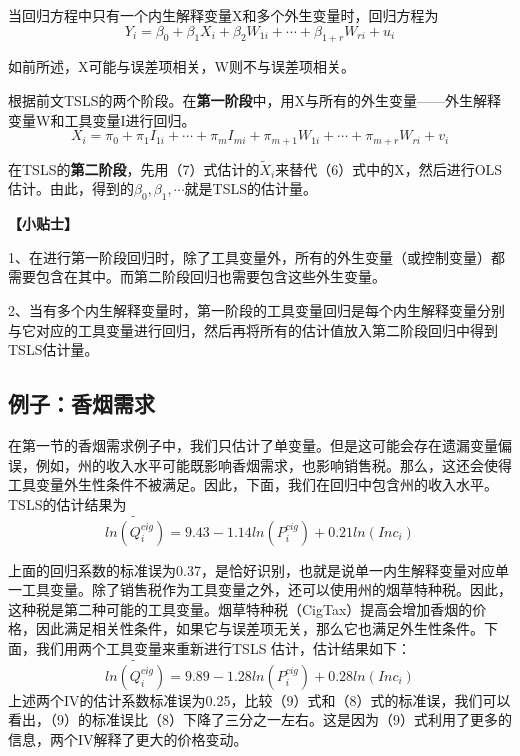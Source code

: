 \documentclass[cn,10pt,math=newtx,citestyle=gb7714-2015,bibstyle=gb7714-2015]{elegantbook}
\begin{document}
	当回归方程中只有一个内生解释变量X和多个外生变量时，回归方程为
	\begin{equation}
		Y_i=\beta_0+\beta_1X_i+\beta_2W_{1i}+\cdots+\beta_{1+r}W_{ri}+u_i
	\end{equation}
	
	如前所述，X可能与误差项相关，W则不与误差项相关。
	
	根据前文TSLS的两个阶段。在\textbf{第一阶段}中，用X与所有的外生变量——外生解释变量W和工具变量I进行回归。
	\begin{equation}
		X_i=\pi_0+\pi_1I_{1i}+\cdots+\pi_mI_{mi}+\pi_{m+1}W_{1i}+\cdots+\pi_{m+r}W_{ri}+v_i
	\end{equation}
	
	在TSLS的\textbf{第二阶段}，先用（7）式估计的$\tilde{X}_i$来替代（6）式中的X，然后进行OLS估计。由此，得到的$\beta_0,\beta_1,\cdots$就是TSLS的估计量。
	
	\textbf{【小贴士】}
	
	1、在进行第一阶段回归时，除了工具变量外，所有的外生变量（或控制变量）都需要包含在其中。而第二阶段回归也需要包含这些外生变量。
	
	2、当有多个内生解释变量时，第一阶段的工具变量回归是每个内生解释变量分别与它对应的工具变量进行回归，然后再将所有的估计值放入第二阶段回归中得到TSLS估计量。
	
	\subsection{例子：香烟需求}
	
	在第一节的香烟需求例子中，我们只估计了单变量。但是这可能会存在遗漏变量偏误，例如，州的收入水平可能既影响香烟需求，也影响销售税。那么，这还会使得工具变量外生性条件不被满足。因此，下面，我们在回归中包含州的收入水平。TSLS的估计结果为
	\begin{equation}
		\tilde{ln(Q_i^{cig})}=9.43-1.14ln(P_i^{cig})+0.21ln(Inc_i)
	\end{equation}
	
	上面的回归系数的标准误为0.37，是恰好识别，也就是说单一内生解释变量对应单一工具变量。除了销售税作为工具变量之外，还可以使用州的烟草特种税。因此，这种税是第二种可能的工具变量。烟草特种税（CigTax）提高会增加香烟的价格，因此满足相关性条件，如果它与误差项无关，那么它也满足外生性条件。下面，我们用两个工具变量来重新进行TSLS 估计，估计结果如下：
	\begin{equation}
		\tilde{ln(Q_i^{cig})}=9.89-1.28ln(P_i^{cig})+0.28ln(Inc_i)
	\end{equation}
	上述两个IV的估计系数标准误为0.25，比较（9）式和（8）式的标准误，我们可以看出，（9）的标准误比（8）下降了三分之一左右。这是因为（9）式利用了更多的信息，两个IV解释了更大的价格变动。
	
\end{document}
